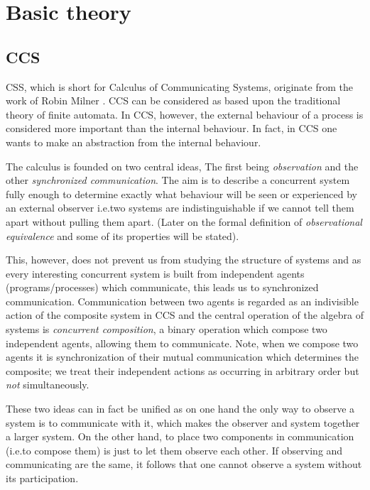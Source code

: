 
\chapter{Basic theory}\label{chapBasic}

\section{CCS}

CSS, which is short for Calculus of Communicating Systems, originate from the work of Robin Milner \cite{Milner}. CCS can be considered as based upon the traditional theory of finite automata. In CCS, however, the external behaviour of a process is considered more important than the internal behaviour. In fact, in CCS one wants to make an abstraction from the internal behaviour.

The calculus is founded on two central ideas, The first being {\it observation\/} and the other {\it synchronized communication}. The aim is to describe a concurrent system fully enough to determine exactly what behaviour will be seen or experienced by an external observer i.e.\@ two systems are indistinguishable if we cannot tell them apart without pulling them apart. (Later on the formal definition of {\it observational equivalence\/} and some of its properties will be stated).

This, however, does not prevent us from studying the structure of systems and as every interesting concurrent system is built from independent agents (programs/processes) which communicate, this leads us to synchronized communication. Communication between two agents is regarded as an indivisible action of the composite system in CCS and the central operation of the algebra of systems is {\it concurrent composition}, a binary operation which compose two independent agents, allowing them to communicate.
Note, when we compose two agents it is synchronization of their mutual communication which determines the composite; we treat their independent actions as occurring in arbitrary order but {\it not\/} simultaneously.

These two ideas can in fact be unified as on one hand the only way to observe a system is to communicate with it, which makes the observer and system together a larger system. On the other hand, to place two components in communication (i.e.\@ to compose them) is just to let them observe each other. If observing and communicating are the same, it follows that one cannot observe a system without its participation.


